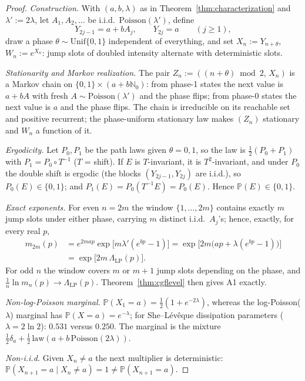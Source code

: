 \documentclass[12pt]{amsart}
\theoremstyle{definition}
\theoremstyle{remark}
\begin{document}
\begin{proof}
\textit{Construction.}  With $(a, b, \lambda)$ as in
Theorem~\ref{thm:characterization} and $\lambda' := 2\lambda$, let
$A_1, A_2, \ldots$ be i.i.d.\ $\mathrm{Poisson}(\lambda')$, define
\[
  Y_{2j-1} = a + bA_j, \qquad Y_{2j} = a \qquad (j \ge 1),
\]
draw a phase $\theta \sim \mathrm{Unif}\{0,1\}$ independent of
everything, and set $X_n := Y_{n+\theta}$, $W_n := e^{X_n}$: jump
slots of doubled intensity alternate with deterministic slots.

\textit{Stationarity and Markov realization.}  The pair $Z_n :=
((n+\theta)\bmod 2,\, X_n)$ is a Markov chain on
$\{0,1\}\times(a+b\mathbb{N}_0)$: from phase-1 states the next value
is $a + bA$ with fresh $A \sim \mathrm{Poisson}(\lambda')$ and the
phase flips; from phase-0 states the next value is $a$ and the phase
flips.  The chain is irreducible on its reachable set and positive
recurrent; the phase-uniform stationary law makes $(Z_n)$
stationary and $W_n$ a function of it.

\textit{Ergodicity.}  Let $P_0, P_1$ be the path laws given $\theta
= 0,1$, so the law is $\tfrac12(P_0+P_1)$ with $P_1 = P_0\circ
T^{-1}$ ($T$ = shift).  If $E$ is $T$-invariant, it is
$T^2$-invariant, and under $P_0$ the double shift is ergodic (the
blocks $(Y_{2j-1}, Y_{2j})$ are i.i.d.), so $P_0(E) \in \{0,1\}$;
and $P_1(E) = P_0(T^{-1}E) = P_0(E)$.  Hence $\mathbb{P}(E) \in
\{0,1\}$.

\textit{Exact exponents.}  For even $n = 2m$ the window
$\{1,\ldots,2m\}$ contains exactly $m$ jump slots under either
phase, carrying $m$ distinct i.i.d.\ $A_j$'s; hence, exactly, for
every real $p$,
\[
\begin{aligned}
  m_{2m}(p)
  &= e^{2map}\exp\bigl[m\lambda'(e^{bp}-1)\bigr]
  = \exp\bigl[2m\bigl(ap + \lambda(e^{bp}-1)\bigr)\bigr]\\
  &= \exp\bigl[2m\,\Lambda_{\mathrm{LP}}(p)\bigr].
\end{aligned}
\]
For odd $n$ the window covers $m$ or $m+1$ jump slots depending on
the phase, and $\tfrac1n\ln m_n(p) \to \Lambda_{\mathrm{LP}}(p)$.
Theorem~\ref{thm:cgflevel} then gives A1 exactly.

\textit{Non-log-Poisson marginal.}  $\mathbb{P}(X_1 = a) =
\tfrac12(1 + e^{-2\lambda})$, whereas the log-Poisson($\lambda$)
marginal has $\mathbb{P}(X = a) = e^{-\lambda}$; for She--L\'ev\^eque
dissipation parameters ($\lambda = 2\ln2$): $0.531$ versus $0.250$.
The marginal is the mixture $\tfrac12\delta_a +
\tfrac12\,\mathrm{law}(a + b\,\mathrm{Poisson}(2\lambda))$.

\textit{Non-i.i.d.}  Given $X_n \ne a$ the next multiplier is
deterministic: $\mathbb{P}(X_{n+1} = a \mid X_n \ne a) = 1 \ne
\mathbb{P}(X_{n+1} = a)$.
\end{proof}
\end{document}
